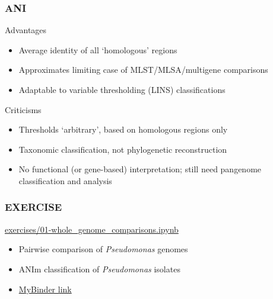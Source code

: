\begin{frame}
  \frametitle{ANI}
  \begin{alertblock}{Advantages}
    \begin{itemize}
      \item Average identity of all `homologous' regions
      \item Approximates limiting case of MLST/MLSA/multigene comparisons
      \item Adaptable to variable thresholding (LINS) classifications
    \end{itemize}    
  \end{alertblock}
  \begin{block}{Criticisms}
    \begin{itemize}
      \item Thresholds `arbitrary', based on homologous regions only
      \item Taxonomic classification, not phylogenetic reconstruction
      \item No functional (or gene-based) interpretation; still need pangenome classification and analysis
    \end{itemize}
  \end{block}
\end{frame}

\begin{frame}
  \frametitle{EXERCISE}
  \begin{alertblock}{\url{exercises/01-whole_genome_comparisons.ipynb}}
    \begin{itemize}
      \item Pairwise comparison of \textit{Pseudomonas} genomes
      \item ANIm classification of \textit{Pseudomonas} isolates
    \end{itemize}
  \end{alertblock}
  \begin{itemize}
    \item \textcolor{hutton_purple}{\href{http://mybinder.org/repo/widdowquinn/Teaching-EMBL-Plant-Path-Genomics}{MyBinder link}}
  \end{itemize}
\end{frame}

